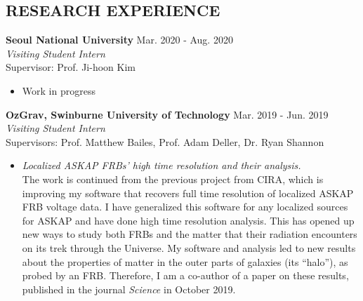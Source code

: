 \documentclass[margin, 10pt]{res} %
\begin{document}
\begin{resume}
 
\section{RESEARCH EXPERIENCE}

{\bf Seoul National University} \hfill Mar. 2020 - Aug. 2020 \\
{\sl Visiting Student Intern} \\
Supervisor: Prof. Ji-hoon Kim
\begin{itemize}
\item[] %
Work in progress
\end{itemize} 

{\bf OzGrav, Swinburne University of Technology} \hfill Mar. 2019 - Jun. 2019 \\
{\sl Visiting Student Intern} \\
Supervisors: Prof. Matthew Bailes, Prof. Adam Deller, Dr. Ryan Shannon
\begin{itemize}
\item[] {\sl Localized ASKAP FRBs' high time resolution and their analysis.}\\
The work is continued from the previous project from CIRA, which is improving my software that recovers full time resolution of localized ASKAP FRB voltage data. I have generalized this software for any localized sources for ASKAP and have done high time resolution analysis. This has opened up new ways to study both FRBs and the matter that their radiation encounters on its trek through the Universe. My software and analysis led to new results about the properties of matter in the outer parts of galaxies (its “halo”), as probed by an FRB. Therefore, I am a co-author of a paper on these results, published in the journal \textit{Science} in October 2019.  %
\end{itemize} 


\end{resume}
\end{document}

